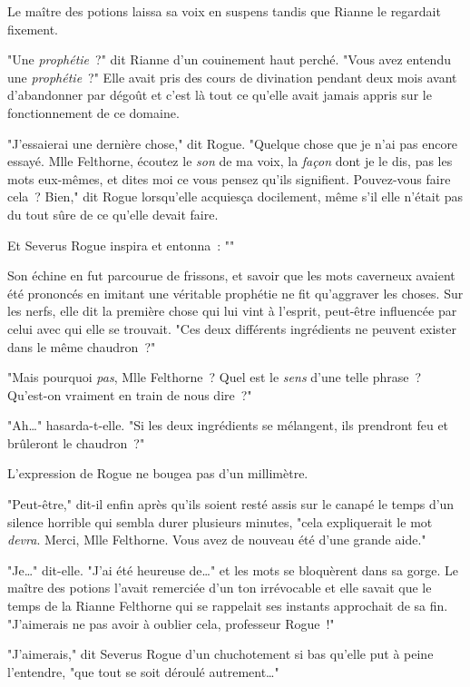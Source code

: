 Le maître des potions laissa sa voix en suspens tandis que Rianne le regardait fixement.

"Une \emph{prophétie}~?" dit Rianne d'un couinement haut perché. "Vous avez entendu une \emph{prophétie}~?" Elle avait pris des cours de divination pendant deux mois avant d'abandonner par dégoût et c'est là tout ce qu'elle avait jamais appris sur le fonctionnement de ce domaine.

"J'essaierai une dernière chose," dit Rogue. "Quelque chose que je n'ai pas encore essayé. Mlle Felthorne, écoutez le \emph{son} de ma voix, la \emph{façon} dont je le dis, pas les mots eux-mêmes, et dites moi ce vous pensez qu'ils signifient. Pouvez-vous faire cela~? Bien," dit Rogue lorsqu'elle acquiesça docilement, même s'il elle n'était pas du tout sûre de ce qu'elle devait faire.

Et Severus Rogue inspira et entonna~: ""

Son échine en fut parcourue de frissons, et savoir que les mots caverneux avaient été prononcés en imitant une véritable prophétie ne fit qu'aggraver les choses. Sur les nerfs, elle dit la première chose qui lui vint à l'esprit, peut-être influencée par celui avec qui elle se trouvait. "Ces deux différents ingrédients ne peuvent exister dans le même chaudron~?"

"Mais pourquoi \emph{pas}, Mlle Felthorne~? Quel est le \emph{sens} d'une telle phrase~? Qu'est-on vraiment en train de nous dire~?"

"Ah…" hasarda-t-elle. "Si les deux ingrédients se mélangent, ils prendront feu et brûleront le chaudron~?"

L'expression de Rogue ne bougea pas d'un millimètre.

"Peut-être," dit-il enfin après qu'ils soient resté assis sur le canapé le temps d'un silence horrible qui sembla durer plusieurs minutes, "cela expliquerait le mot \emph{devra}. Merci, Mlle Felthorne. Vous avez de nouveau été d'une grande aide."

"Je…" dit-elle. "J'ai été heureuse de…" et les mots se bloquèrent dans sa gorge. Le maître des potions l'avait remerciée d'un ton irrévocable et elle savait que le temps de la Rianne Felthorne qui se rappelait ses instants approchait de sa fin. "J'aimerais ne pas avoir à oublier cela, professeur Rogue~!"

"J'aimerais," dit Severus Rogue d'un chuchotement si bas qu'elle put à peine l'entendre, "que tout se soit déroulé autrement…"

